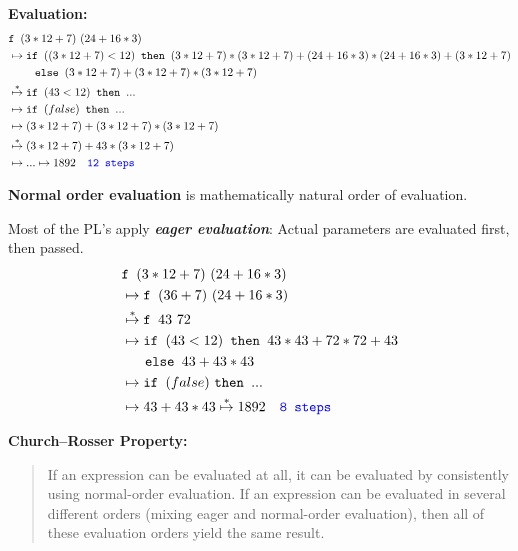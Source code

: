 \noindent \textbf{Evaluation:}
\begin{align*}
  &\texttt{f } (3*12 + 7)\ (24 + 16*3) \\
  &\mapsto \texttt{if } ((3*12 + 7) < 12) \texttt{ then } (3*12 + 7) * (3*12 + 7) + (24 + 16*3) * (24 + 16*3) + (3*12 + 7)\\
  &\quad\ \ \ \ \texttt{else } (3*12 + 7) + (3*12 + 7) * (3*12 + 7)\\
  &\stackrel{*}{\mapsto} \texttt{if } (43 < 12) \texttt{ then } ...\\
  &\mapsto \texttt{if } (false) \texttt{ then } ...\\
  &\mapsto (3*12 + 7) + (3*12 + 7) * (3*12 + 7)\\
  &\stackrel{*}{\mapsto} (3*12 + 7) + 43 * (3*12 + 7)\\
  &\mapsto ... \mapsto 1892\quad \texttt{\textcolor{blue}{12 steps}}
\end{align*}

\noindent \textbf{Normal order evaluation} is mathematically natural order of evaluation.

\newpage

Most of the PL's apply \textit{\textbf{eager evaluation}}: Actual parameters are evaluated first, then passed.
\begin{align*}
  &\texttt{f } (3*12+7)\ (24+16*3) \\
  &\mapsto \texttt{f } (36+7)\ (24+16*3) \\
  &\stackrel{*}{\mapsto} \texttt{f } 43\ 72 \\
  &\mapsto \texttt{if } (43 < 12) \texttt{ then } 43*43 + 72*72 + 43 \\
  &\quad\ \ \texttt{else } 43+43*43\\
  &\mapsto \texttt{if } (false)\ \texttt{then } ...\\
  &\mapsto 43 + 43*43 \stackrel{*}{\mapsto} 1892 \quad \texttt{\textcolor{blue}{8 steps}}
\end{align*}

\noindent \textbf{Church–Rosser Property:} 
\begin{quote}
  If an expression can be evaluated at all, it can be evaluated by consistently using normal-order evaluation. If an expression can be evaluated in several different orders (mixing eager and normal-order evaluation), then all of these evaluation orders yield the same result.
\end{quote}


